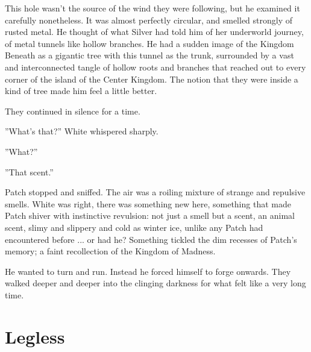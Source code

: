 \documentclass[12pt]{book}
\begin{document}
 This hole wasn't the source of the wind they were following, but he examined it carefully nonetheless. It was almost perfectly circular, and smelled strongly of rusted metal. He thought of what Silver had told him of her underworld journey, of metal tunnels like hollow branches. He had a sudden image of the Kingdom Beneath as a gigantic tree with this tunnel as the trunk, surrounded by a vast and interconnected tangle of hollow roots and branches that reached out to every corner of the island of the Center Kingdom. The notion that they were inside a kind of tree made him feel a little better.\par
 They continued in silence for a time.\par
 ''What's that?'' White whispered sharply.\par
 ''What?''\par
 ''That scent.''\par
 Patch stopped and sniffed. The air was a roiling mixture of strange and repulsive smells. White was right, there was something new here, something that made Patch shiver with instinctive revulsion: not just a smell but a scent, an animal scent, slimy and slippery and cold as winter ice, unlike any Patch had encountered before ... or had he? Something tickled the dim recesses of Patch's memory; a faint recollection of the Kingdom of Madness.\par
 He wanted to turn and run. Instead he forced himself to forge onwards. They walked deeper and deeper into the clinging darkness for what felt like a very long time.\par

\section{Legless}
\end{document}

